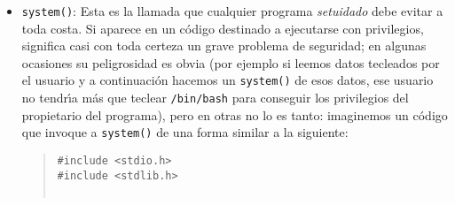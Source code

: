 \begin{itemize}
\item {\tt system()}: Esta es la llamada que cualquier programa {\it setuidado}
debe evitar a toda costa. Si aparece en un c\'odigo destinado a ejecutarse con
privilegios, significa casi con toda certeza un grave problema de seguridad; en
algunas ocasiones su peligrosidad es obvia (por ejemplo si leemos datos 
tecleados por el usuario y a continuaci\'on hacemos un {\tt system()} de esos
datos, ese usuario no tendr\'{\i}a m\'as que teclear {\tt /bin/bash} para 
conseguir los privilegios del propietario del programa), pero en otras no lo es
tanto: imaginemos un c\'odigo que invoque a {\tt system()} de una forma similar
a la siguiente:
\begin{quote}
\begin{verbatim}
#include <stdio.h>
#include <stdlib.h>


\end{verbatim}
\end{quote}
\end{itemize}
